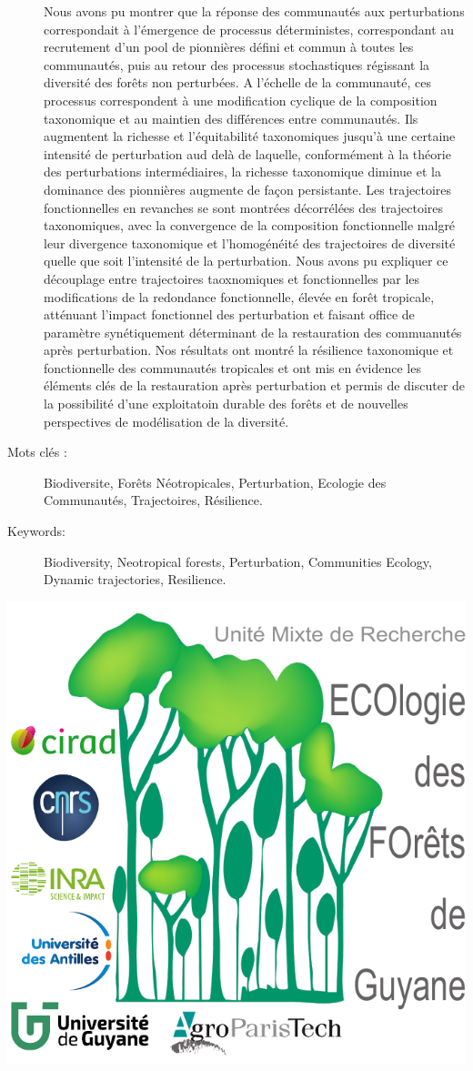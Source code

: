 \documentclass[
  11pt,
  french,
  A4paper,
  extrafontsizes,onecolumn,openright
  ]{memoir}
\begin{document}
\begin{normalsize}
\begin{description}
Nous avons pu montrer que la réponse des communautés aux perturbations
correspondait à l'émergence de processus déterministes, correspondant au
recrutement d'un pool de pionnières défini et commun à toutes les
communautés, puis au retour des processus stochastiques régissant la
diversité des forêts non perturbées. A l'échelle de la communauté, ces
processus correspondent à une modification cyclique de la composition
taxonomique et au maintien des différences entre communautés. Ils
augmentent la richesse et l'équitabilité taxonomiques jusqu'à une
certaine intensité de perturbation aud delà de laquelle, conformément à
la théorie des perturbations intermédiaires, la richesse taxonomique
diminue et la dominance des pionnières augmente de façon persistante.
Les trajectoires fonctionnelles en revanches se sont montrées
décorrélées des trajectoires taxonomiques, avec la convergence de la
composition fonctionnelle malgré leur divergence taxonomique et
l'homogénéité des trajectoires de diversité quelle que soit l'intensité
de la perturbation. Nous avons pu expliquer ce découplage entre
trajectoires taoxnomiques et fonctionnelles par les modifications de la
redondance fonctionnelle, élevée en forêt tropicale, atténuant l'impact
fonctionnel des perturbation et faisant office de paramètre
synétiquement déterminant de la restauration des commuanutés après
perturbation. Nos résultats ont montré la résilience taxonomique et
fonctionnelle des communautés tropicales et ont mis en évidence les
éléments clés de la restauration après perturbation et permis de
discuter de la possibilité d'une exploitatoin durable des forêts et de
nouvelles perspectives de modélisation de la diversité.

\item[Mots clés :]
Biodiversite, Forêts Néotropicales, Perturbation, Ecologie des Communautés, Trajectoires, Résilience.
~\\


\item[Keywords:]
Biodiversity, Neotropical forests, Perturbation, Communities Ecology, Dynamic trajectories, Resilience.

\end{description}

\end{normalsize}

\vspace*{\fill}
\centering\includegraphics[width=.3\textwidth]{images/Logo-Lab}
\end{document}

